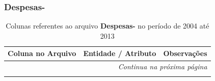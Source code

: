 \subsubsection{Despesas-}

\small
\begin{longtable}{|p{4.0cm}|p{5.0cm}|p{5.5cm}|}
\caption{Colunas referentes ao arquivo \textbf{Despesas-} no período de 2004 até 2013}
\label{tabela-mapeamento-base-grupo-Despesas--periodo-2004-2013} \\ 
    \hline
    \textbf{Coluna no Arquivo} & \textbf{Entidade / Atributo} & \textbf{Observações} \\ \hline
    \endhead

    \hline \multicolumn{3}{r}{\textit{Continua na próxima página}} \\ \hline
    \endfoot

    \hline
    \endlastfoot


\end{longtable}
